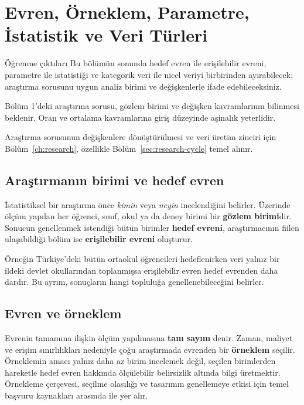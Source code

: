 \chapter{Evren, Örneklem, Parametre, İstatistik ve Veri Türleri}
\label{ch:population-data}

\begin{prismbox}[PrismLight]{Öğrenme çıktıları}
Bu bölümün sonunda hedef evren ile erişilebilir evreni, parametre ile
istatistiği ve kategorik veri ile nicel veriyi birbirinden ayırabilecek;
araştırma sorusunu uygun analiz birimi ve değişkenlerle ifade edebileceksiniz.
\end{prismbox}

\begin{prerequisitebox}
Bölüm 1'deki araştırma sorusu, gözlem birimi ve değişken kavramlarının
bilinmesi beklenir. Oran ve ortalama kavramlarına giriş düzeyinde aşinalık
yeterlidir.
\end{prerequisitebox}

Araştırma sorusunun değişkenlere dönüştürülmesi ve veri üretim zinciri için
Bölüm~\ref{ch:research}, özellikle Bölüm~\ref{sec:research-cycle} temel alınır.

\section{Araştırmanın birimi ve hedef evren}
\label{sec:population-target}

İstatistiksel bir araştırma önce \emph{kimin} veya \emph{neyin} incelendiğini
belirler. Üzerinde ölçüm yapılan her öğrenci, sınıf, okul ya da deney birimi
bir \textbf{gözlem birimi}dir. Sonucun genellenmek istendiği bütün birimler
\textbf{hedef evreni}, araştırmacının fiilen ulaşabildiği bölüm ise
\textbf{erişilebilir evreni} oluşturur.

Örneğin Türkiye'deki bütün ortaokul öğrencileri hedeflenirken veri yalnız bir
ildeki devlet okullarından toplanmışsa erişilebilir evren hedef evrenden daha
dardır. Bu ayrım, sonuçların hangi topluluğa genellenebileceğini belirler.

\section{Evren ve örneklem}

Evrenin tamamına ilişkin ölçüm yapılmasına \textbf{tam sayım} denir. Zaman,
maliyet ve erişim sınırlılıkları nedeniyle çoğu araştırmada evrenden bir
\textbf{örneklem} seçilir. Örneklemin amacı yalnız daha az birim incelemek
değil, seçilen birimlerden hareketle hedef evren hakkında ölçülebilir
belirsizlik altında bilgi üretmektir.
Örnekleme çerçevesi, seçilme olasılığı ve tasarımın genellemeye etkisi için
temel başvuru kaynakları arasında \citet{cochran1977} ile \citet{lohr2021}
yer alır.

